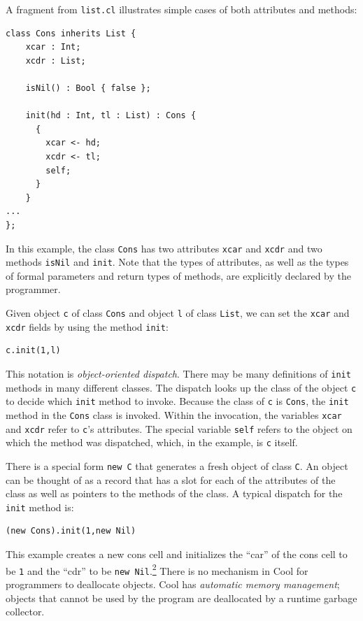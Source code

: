 \documentclass[]{article}
\begin{document}
A fragment from \texttt{list.cl} illustrates simple cases of both
attributes and methods:

\begin{verbatim}
class Cons inherits List {
    xcar : Int;
    xcdr : List;

    isNil() : Bool { false };

    init(hd : Int, tl : List) : Cons {
      {
        xcar <- hd;
        xcdr <- tl;
        self;
      }
    }
...
};
\end{verbatim}

In this example, the class \texttt{Cons} has two attributes
\texttt{xcar} and \texttt{xcdr} and two methods \texttt{isNil} and
\texttt{init}. Note that the types of attributes, as well as the types
of formal parameters and return types of methods, are explicitly
declared by the programmer.

Given object \texttt{c} of class \texttt{Cons} and object \texttt{l} of
class \texttt{List}, we can set the \texttt{xcar} and \texttt{xcdr}
fields by using the method \texttt{init}:

\begin{verbatim}
c.init(1,l)
\end{verbatim}

This notation is \emph{object-oriented dispatch}. There may be many
definitions of \texttt{init} methods in many different classes. The
dispatch looks up the class of the object \texttt{c} to decide which
\texttt{init} method to invoke. Because the class of \texttt{c} is
\texttt{Cons}, the \texttt{init} method in the \texttt{Cons} class is
invoked. Within the invocation, the variables \texttt{xcar} and
\texttt{xcdr} refer to \texttt{c}'s attributes. The special variable
\texttt{self} refers to the object on which the method was dispatched,
which, in the example, is \texttt{c} itself.

There is a special form \texttt{new C} that generates a fresh object of
class \texttt{C}. An object can be thought of as a record that has a
slot for each of the attributes of the class as well as pointers to the
methods of the class. A typical dispatch for the \texttt{init} method
is:

\begin{verbatim}
(new Cons).init(1,new Nil)
\end{verbatim}

This example creates a new cons cell and initializes the ``car'' of the
cons cell to be \texttt{1} and the ``cdr'' to be
\texttt{new Nil}.\href{footnode.html\#foot1771}{\textsuperscript{2}}
There is no mechanism in Cool for programmers to deallocate objects.
Cool has \emph{automatic memory management}; objects that cannot be used
by the program are deallocated by a runtime garbage collector.
\end{document}
